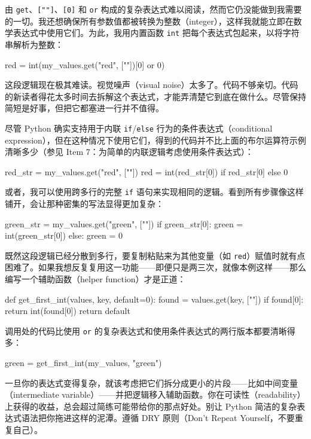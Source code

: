 由 \texttt{get}、\texttt{[""]}、\texttt{[0]} 和 \texttt{or} 构成的复杂表达式难以阅读，然而它仍没能做到我需要的一切。我还想确保所有参数值都被转换为整数（integer），这样我就能立即在数学表达式中使用它们。为此，我用内置函数 \texttt{int} 把每个表达式包起来，以将字符串解析为整数：

\begin{codebox}[python]
red = int(my_values.get("red", [""])[0] or 0)
\end{codebox}

这段逻辑现在极其难读。视觉噪声（visual noise）太多了。代码不够亲切。代码的新读者得花太多时间去拆解这个表达式，才能弄清楚它到底在做什么。尽管保持简短是好事，但把它都塞进一行并不值得。

尽管 Python 确实支持用于内联 \texttt{if}/\texttt{else} 行为的条件表达式（conditional expression），但在这种情况下使用它们，得到的代码并不比上面的布尔运算符示例清晰多少（参见 Item 7：为简单的内联逻辑考虑使用条件表达式）：

\begin{codebox}[python]
red_str = my_values.get("red", [""])
red = int(red_str[0]) if red_str[0] else 0
\end{codebox}

或者，我可以使用跨多行的完整 \texttt{if} 语句来实现相同的逻辑。看到所有步骤像这样铺开，会让那种密集的写法显得更加复杂：

\begin{codebox}[python]
green_str = my_values.get("green", [""])
if green_str[0]:
    green = int(green_str[0])
else:
    green = 0
\end{codebox}

既然这段逻辑已经分散到多行，要复制粘贴来为其他变量（如 \texttt{red}）赋值时就有点困难了。如果我想反复复用这一功能——即便只是两三次，就像本例这样——那么编写一个辅助函数（helper function）才是正道：

\begin{codebox}[python]
def get_first_int(values, key, default=0):
    found = values.get(key, [""])
    if found[0]:
        return int(found[0])
    return default
\end{codebox}

调用处的代码比使用 \texttt{or} 的复杂表达式和使用条件表达式的两行版本都要清晰得多：

\begin{codebox}[python]
green = get_first_int(my_values, "green")
\end{codebox}

一旦你的表达式变得复杂，就该考虑把它们拆分成更小的片段——比如中间变量（intermediate variable）——并把逻辑移入辅助函数。你在可读性（readability）上获得的收益，总会超过简练可能带给你的那点好处。别让 Python 简洁的复杂表达式语法把你拖进这样的泥潭。遵循 DRY 原则（Don't Repeat Yourself，不要重复自己）。

